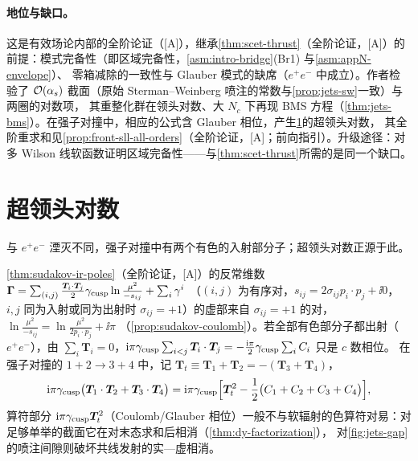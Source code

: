 \paragraph{地位与缺口。}
这是有效场论内部的全阶论证（[A]），继承\cref{thm:scet-thrust}（全阶论证，[A]）的前提：模式完备性（即区域完备性，\cref{asm:intro-bridge}(Br1) 与\cref{asm:appN-envelope}）、
零箱减除的一致性与 Glauber 模式的缺席（$e^+e^-$ 中成立）。作者检验了 $\mathcal{O}\!\left(\alpha_s\right)$ 截面（原始 Sterman--Weinberg 喷注的常数与\cref{prop:jets-sw}一致）与两圈的对数项，
其重整化群在领头对数、大 $N_c$ 下再现 BMS 方程（\cref{thm:jets-bms}）。在强子对撞中，相应的公式含 Glauber 相位，产生\cref{sec:jets-sll}的超领头对数，
其全阶重求和见\cref{prop:front-sll-all-orders}（全阶论证，[A]；前向指引）。升级途径：对多 Wilson 线软函数证明区域完备性——与\cref{thm:scet-thrust}所需的是同一个缺口。
\section{超领头对数}\label{sec:jets-sll}

与 $e^+e^-$ 湮灭不同，强子对撞中有两个有色的入射部分子；超领头对数正源于此。

\cref{thm:sudakov-ir-poles}（全阶论证，[A]）的反常维数 $\bm\Gamma=\sum_{(i,j)}\frac{\bm T_i\cdot\bm T_j}{2}\gamma_{\rm cusp}\ln\frac{\mu^2}{-s_{ij}}+\sum_i\gamma^i$
（$(i,j)$ 为有序对，$s_{ij}=2\sigma_{ij}p_i\cdot p_j+\ii0$，$i,j$ 同为入射或同为出射时 $\sigma_{ij}=+1$）的虚部来自 $\sigma_{ij}=+1$ 的对，$\ln\frac{\mu^2}{-s_{ij}}=\ln\frac{\mu^2}{2p_i\cdot p_j}+\ii\pi$
（\cref{prop:sudakov-coulomb}）。若全部有色部分子都出射（$e^+e^-$），由 $\sum_i\bm T_i=0$，$\mathrm{i}\pi\gamma_{\rm cusp}\sum_{i<j}\bm T_i\cdot\bm T_j=-\frac{\mathrm{i}\pi}{2}\gamma_{\rm cusp}\sum_iC_i$ 只是 $c$ 数相位。
在强子对撞的 $1+2\to3+4$ 中，记 $\bm T_t\equiv\bm T_1+\bm T_2=-(\bm T_3+\bm T_4)$，
\begin{equation}\label{eq:jets-coulomb-pp}
\mathrm{i}\pi\gamma_{\rm cusp}\big(\bm T_1\cdot\bm T_2+\bm T_3\cdot\bm T_4\big)=\mathrm{i}\pi\gamma_{\rm cusp}\Big[\bm T_t^2-\frac12\big(C_1+C_2+C_3+C_4\big)\Big],
\end{equation}
算符部分 $\mathrm{i}\pi\gamma_{\rm cusp}\bm T_t^2$（Coulomb/Glauber 相位）一般不与软辐射的色算符对易：对足够单举的截面它在对末态求和后相消（\cref{thm:dy-factorization}），
对\cref{fig:jets-gap}的喷注间隙则破坏共线发射的实—虚相消。

